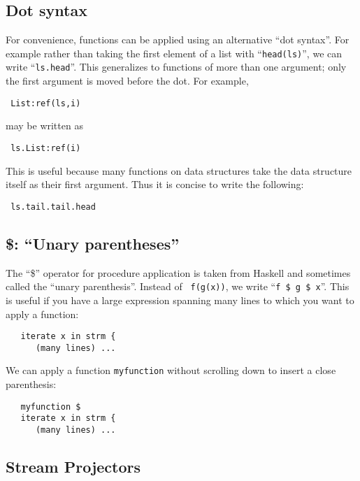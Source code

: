 \documentclass[twocolumn]{report}
\newcommand{\cd}{\tt}
\newenvironment{wscode}{\begin{center}\tt}{\end{center}}
\begin{document}
\subsection{Dot syntax}
  For convenience, functions can be applied using an
alternative ``dot syntax''.  For example rather than taking the first
element of a list with ``{\cd head(ls)}'', we can write ``{\cd ls.head}''.
This generalizes to functions of more than one argument; only the
first argument is moved before the dot.  For example, 
\vspace{-2mm}
\begin{wscode}
List:ref(ls,i)
\end{wscode}
\vspace{-2mm}
 may be written as 
\vspace{-2mm}
\begin{wscode}
ls.List:ref(i)
\end{wscode}
\vspace{-2mm}
This is useful because many functions on data structures take the
data structure itself as their first argument.  Thus it is concise to
write the following:
\vspace{-2mm}
\begin{wscode}
ls.tail.tail.head
\end{wscode}
\vspace{-2mm}


\subsection{\$: ``Unary parentheses''}

The ``\$'' operator for procedure application is taken from Haskell
and sometimes called the ``unary parenthesis''.  Instead of {\cd
  f(g(x))}, we write ``{\cd f \$ g \$ x}''.
This is useful if you have a large expression spanning many lines to
which you want to apply a function:
\begin{verbatim}
   iterate x in strm { 
      (many lines) ... 
\end{verbatim}
We can apply a function {\cd myfunction} without scrolling down to
insert a close parenthesis:
\begin{verbatim}
   myfunction $
   iterate x in strm { 
      (many lines) ... 
\end{verbatim}


\subsection{Stream Projectors}
\end{document}
